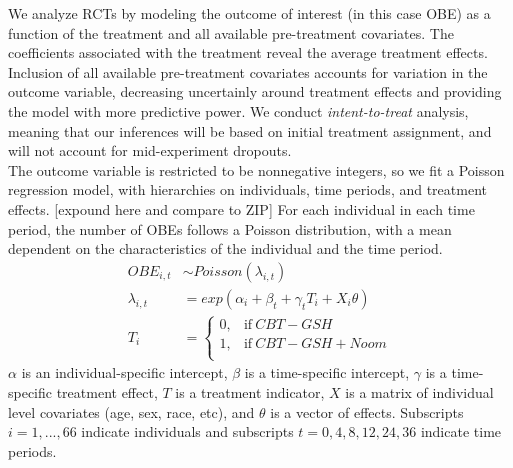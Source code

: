 \documentclass{article}
\begin{document}
We analyze RCTs by modeling the outcome of interest (in this case OBE) as a function of the treatment and all available pre-treatment covariates.  The coefficients associated with the treatment reveal the average treatment effects.  Inclusion of all available pre-treatment covariates accounts for variation in the outcome variable, decreasing uncertainly around treatment effects and providing the model with more predictive power.  We conduct \emph{intent-to-treat} analysis, meaning that our inferences will be based on initial treatment assignment, and will not account for mid-experiment dropouts. \\
The outcome variable is restricted to be nonnegative integers, so we fit a Poisson regression model, with hierarchies on individuals, time periods, and treatment effects. [expound here and compare to ZIP] For each individual in each time period, the number of OBEs follows a Poisson distribution, with a mean dependent on the characteristics of the individual and the time period.  
\begin{align}
OBE_{i,t} &\sim Poisson(\lambda_{i,t}) \\
\lambda_{i,t} &= exp(\alpha_i + \beta_t + \gamma_tT_i + X_i\theta) \\
T_i &=
    \begin{cases}
      0, & \text{if}\ CBT-GSH \\
      1, & \text{if}\ CBT-GSH + Noom \\
    \end{cases}
\end{align}
$\alpha$ is an individual-specific intercept, $\beta$ is a time-specific intercept, $\gamma$ is a time-specific treatment effect, $T$ is a treatment indicator, $X$ is a matrix of individual level covariates (age, sex, race, etc), and $\theta$ is a vector of effects. Subscripts $i = 1, ..., 66$ indicate individuals and subscripts $t = 0, 4, 8, 12, 24, 36$ indicate time periods.
\end{document}
